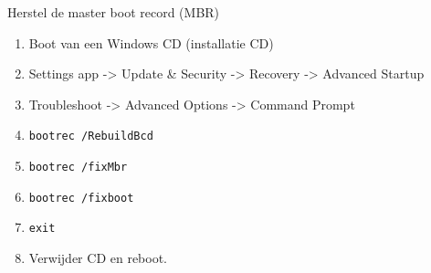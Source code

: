 Herstel de master boot record (MBR)
\begin{enumerate}
\item Boot van een Windows CD (installatie CD)
\item Settings app -> Update \& Security -> Recovery -> Advanced Startup
\item Troubleshoot -> Advanced Options -> Command Prompt 
\item \texttt{bootrec /RebuildBcd}
\item \texttt{bootrec /fixMbr}
\item \texttt{bootrec /fixboot}
\item \texttt{exit}
\item Verwijder CD en reboot.
\end{enumerate}
